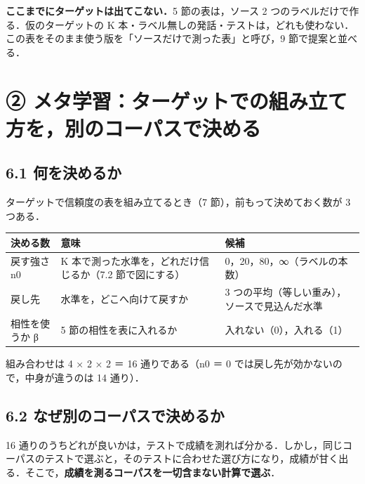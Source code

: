 \documentclass[a4paper,11pt]{ltjsarticle}
\begin{document}
\begin{chui}
\textbf{ここまでにターゲットは出てこない．}5 節の表は，ソース 2 つのラベルだけで作る．仮のターゲットの K 本・ラベル無しの発話・テストは，どれも使わない．この表をそのまま使う版を「ソースだけで測った表」と呼び，9 節で提案と並べる．
\end{chui}

\section{② メタ学習：ターゲットでの組み立て方を，別のコーパスで決める}

\subsection*{6.1 何を決めるか}

ターゲットで信頼度の表を組み立てるとき（7 節），前もって決めておく数が 3 つある．

\begin{center}
\small
\begin{tabular}{>{\raggedright}p{4.3cm}>{\raggedright}p{7.4cm}p{3.3cm}}
\toprule
決める数 & 意味 & 候補 \\
\midrule
戻す強さ n0 & K 本で測った水準を，どれだけ信じるか（7.2 節で図にする） & 0，20，80，∞（ラベルの本数） \\
戻し先 & 水準を，どこへ向けて戻すか & 3 つの平均（等しい重み），ソースで見込んだ水準 \\
相性を使うか β & 5 節の相性を表に入れるか & 入れない（0），入れる（1） \\
\bottomrule
\end{tabular}
\end{center}
組み合わせは 4 × 2 × 2 ＝ 16 通りである（n0 ＝ 0 では戻し先が効かないので，中身が違うのは 14 通り）．

\subsection*{6.2 なぜ別のコーパスで決めるか}

16 通りのうちどれが良いかは，テストで成績を測れば分かる．しかし，同じコーパスのテストで選ぶと，そのテストに合わせた選び方になり，成績が甘く出る．そこで，\textbf{成績を測るコーパスを一切含まない計算で選ぶ}．
\end{document}
